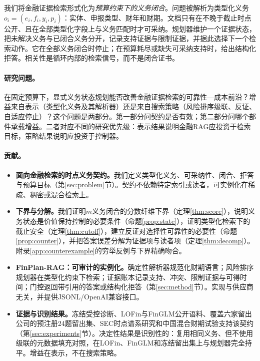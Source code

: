\documentclass[10.5pt,a4paper]{ctexart}
\newcommand{\finplan}{FinPlan\mbox{-}RAG}
\begin{document}
我们将金融证据检索形式化为\emph{预算约束下的义务闭合}。问题被解析为类型化义务$o_i=(e_i,f_i,y_i,p_i)$：实体、申报类型、财年和财期。文档只有在不晚于截止时点公开、且在全部类型化字段上与义务匹配时才可采纳。规划器维护一个证据状态，把未解决义务与已闭合义务分开，记录支持证据与限制证据，并据此选择下一个检索动作。它在全部义务闭合时停止；在预算耗尽或缺失可采纳支持时，给出结构化拒答。相关性是循环内部的检索信号，而不是闭合证书。

\paragraph{研究问题。}在固定预算下，显式义务状态规划能否改善金融证据检索的可靠性—成本前沿？增益来自表示（类型化义务及其解析器）还是来自搜索策略（风险排序级联、反证、自适应停止）？这个问题是两部分。第一部分问契约是否有效；第二部分问哪个部件承载增益。二者对应不同的研究优先级：表示结果说明金融RAG应投资于检索目标，策略结果说明应投资于控制器。

\paragraph{贡献。}
\begin{itemize}[leftmargin=*,topsep=2pt,itemsep=1pt]
\item \textbf{面向金融检索的时点义务契约。}我们定义类型化义务、可采纳性、闭合、拒答与预算目标（第\ref{sec:problem}节）。契约不依赖特定索引或读者，可实例化在稀疏、稠密或混合检索上。
\item \textbf{下界与分解。}我们证明$m$义务闭合的分数纤维下界（定理\ref{thm:score}），说明义务状态是价值保持控制的必要条件（命题\ref{prop:state}），证明类型化检索下的截止安全（定理\ref{thm:cutoff}），建立反证对选择性可靠性的必要性（命题\ref{prop:counter}），并把答案误差分解为证据项与读者项（定理\ref{thm:decomp}）。附录\ref{app:counterexample}的穷举反例与下界精确吻合。
\item \textbf{\finplan{}：可审计的实例化。}确定性解析器规范化财期语言；风险排序规划器在类型化约束下检索；证据账本记录支持、冲突、限制证据与可得时间；门控返回带引用的答案或结构化拒答（第\ref{sec:method}节）。实现与供应商无关，并提供JSONL/OpenAI兼容接口。
\item \textbf{证据与识别结果。}冻结受控诊断、LOFin与FinGLM公开语料、覆盖六家留出公司的预注册24题留出集、SEC时点谱系研究和中国混合财期试验支持该契约（第\ref{sec:experiments}节）。决定性结果是识别性的：复用相同义务、但不使用级联的元数据填充对照，在LOFin、FinGLM和冻结留出集上与规划器完全持平。增益在表示，不在搜索策略。
\end{itemize}
\end{document}
